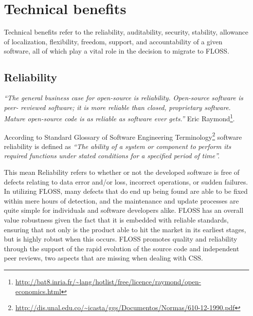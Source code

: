  \section{Technical benefits}

 Technical benefits refer to the reliability, auditability, security, stability, allowance of localization, flexibility, freedom, support, and accountability of a given software, all of which play a vital role in the decision to migrate to FLOSS.


 \subsection {Reliability}
 \textit{``The general business case for open-source is reliability. Open-source software is peer- reviewed software; it is more reliable than closed, proprietary software. Mature open-source code is as reliable as software ever gets.''}
  Eric Raymond\footnote{\url{http://bat8.inria.fr/~lang/hotlist/free/licence/raymond/open-economics.html}}.

 According to Standard Glossary of Software Engineering Terminology\footnote{ \url {http://dis.unal.edu.co/~icasta/ggs/Documentos/Normas/610-12-1990.pdf}} software reliability is defined as \textit{``The ability of a system or component to perform its required functions under stated conditions for a specified period of time''.}

 This mean Reliability refers to whether or not the developed software is free of defects relating to data error and/or loss, incorrect operations, or sudden failures. In utilizing FLOSS, many defects that do end up being found are able to be fixed within mere hours of detection, and the maintenance and update processes are quite simple for individuals and software developers alike. FLOSS has an overall value robustness given the fact that it is embedded with reliable standards, ensuring that not only is the product able to hit the market in its earliest stages, but is highly robust when this occurs. FLOSS promotes quality and reliability through the support of the rapid evolution of the source code and independent peer reviews, two aspects that are missing when dealing with CSS.


